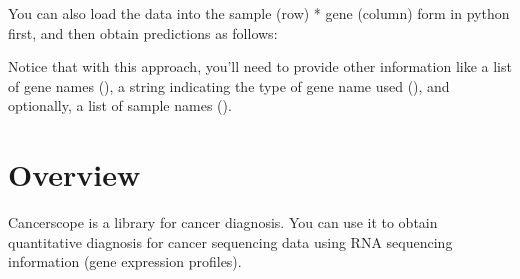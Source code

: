 \documentclass[letterpaper,10pt,english]{sphinxmanual}
\begin{document}
You can also load the data into the sample (row) * gene (column) form in python first, and then obtain predictions as follows:

\begin{sphinxVerbatim}[commandchars=\\\{\}]
   
           
\end{sphinxVerbatim}

Notice that with this approach, you’ll need to provide other information like a list of gene names (), a string indicating the type of gene name used (), and optionally, a list of sample names ().


\chapter{Overview}
\label{\detokenize{index:overview}}\label{\detokenize{index:home}}
Cancerscope is a library for cancer diagnosis. You can use it to obtain quantitative diagnosis for cancer sequencing data using RNA sequencing information (gene expression profiles).



\renewcommand{\indexname}{Index}
\printindex
\end{document}
